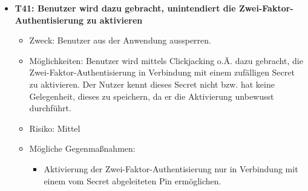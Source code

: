 \documentclass[12pt,DIV14,BCOR10mm,a4paper,parskip=half-,headsepline,headinclude,english,ngerman,bibliography=totocnumbered]{scrreprt}
\begin{document}
\begin{itemize}
  \hypertarget{threat41}{}
  \item \textbf{T41: Benutzer wird dazu gebracht, unintendiert die Zwei-Faktor-Authentisierung zu aktivieren}
  \begin{itemize}
    \item Zweck: Benutzer aus der Anwendung aussperren.
    \item Möglichkeiten: Benutzer wird mittels Clickjacking o.Ä. dazu gebracht, die Zwei-Faktor-Authentisierung in Verbindung mit einem zufälligen Secret zu aktivieren. Der Nutzer kennt dieses Secret nicht bzw. hat keine Gelegenheit, dieses zu speichern, da er die Aktivierung unbewusst durchführt.
    \item Risiko: Mittel
    \item Mögliche Gegenmaßnahmen:
      \begin{itemize}
      	\item Aktivierung der Zwei-Faktor-Authentisierung nur in Verbindung mit einem vom Secret abgeleiteten Pin ermöglichen.
      \end{itemize}
  \end{itemize}
  
\end{itemize}
\end{document}
